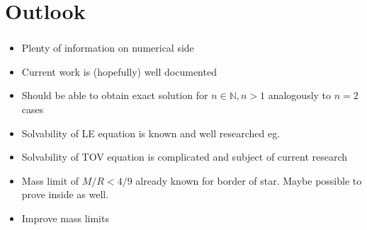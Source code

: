 \section{Outlook}

\begin{frame}
	\frametitle{\insertsection}
	\begin{itemize}[<+->]
		\item Plenty of information on numerical side
		\item Current work is (hopefully) well documented
		\item Should be able to obtain exact solution for $n\in\mathbb{N}, n>1$ analogously to $n=2$ cases
		\item Solvability of LE equation is known and well researched eg. \cite{quittnerSuperlinearParabolicProblems2007a}
		\item Solvability of TOV equation is complicated and subject of current research \cite{martinsExistenceClassificationPseudoAsymptotic2019, boonsermSolutionGeneratingTheorems2007}
		\item Mass limit of $M/R<4/9$ already known for border of star. Maybe possible to prove inside as well.
		\item Improve mass limits
	\end{itemize}
\end{frame}
